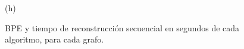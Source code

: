 \begin{figure}
\begin{minipage}{1\textwidth}
\begin{minipage}{0.45\textwidth}
    			(h)
    		\end{minipage}  
    	\end{minipage}
    	
%    		
    	 
    \caption{BPE y tiempo de reconstrucción secuencial en segundos de cada algoritmo, para cada grafo.}
    \label{fig:bpetSec}
\end{figure}
